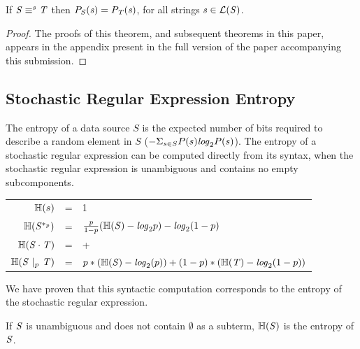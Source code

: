 \documentclass[acmsmall,screen,anonymous]{acmart}
\begin{document}
\begin{theorem}
  If $\mathit{S} \equiv^s \mathit{T}$ then $P_{\mathit{S}}(\mathit{s}) =
  P_{\mathit{T}}(\mathit{s})$, for all strings $\mathit{s} \in \mathcal{L}(\mathit{S})$.
\end{theorem}
\begin{proof}
  The proofs of this theorem, and subsequent theorems in this paper, appears in
  the appendix present in the full version of the paper accompanying this
  submission.
\end{proof}

\subsection{Stochastic Regular Expression Entropy}
The entropy of a data source $S$ is the expected number of bits required to
describe a random element in $S$ ($-\Sigma_{s\in S}P(s)\mathit{log}_2P(s)$). The entropy
of a stochastic regular expression can be computed directly from its syntax,
when the stochastic regular expression is unambiguous and contains no empty
subcomponents.
\begin{center}
  \begin{tabular}{rcl}
    $\mathbb{H}(s)$
    & =
    & 1\\
    
    $\mathbb{H}(\mathit{S}^{*_{p}})$
    & =
    & $\frac{p}{1-p}(\mathbb{H}(\mathit{S}) - \mathit{log}_2p)
      - \mathit{log}_2(1-p)$\\
    
    $\mathbb{H}({\mathit{S}\cdot\mathit{T}})$
    & =
    & \EntropyOf{\Regex} + \EntropyOf{\RegexAlt}\\
    
    $\mathbb{H}(\mathit{S}~|_{p}~\mathit{T})$
    & =
    & $p*(\mathbb{H}(\mathit{S}) - \mathit{log}_2(p)) + (1-p)*(\mathbb{H}(\mathit{T}) - \mathit{log}_2(1-p))$\\
  \end{tabular}
\end{center}
We have proven that this syntactic computation corresponds to the entropy of the
stochastic regular expression.

\begin{theorem}
  \label{thm:correct_entropy}
  If $\mathit{S}$ is unambiguous and does not contain $\emptyset$ as a subterm,
  $\mathbb{H}(\mathit{S})$ is the entropy of $\mathit{S}$.
\end{theorem}
\end{document}
